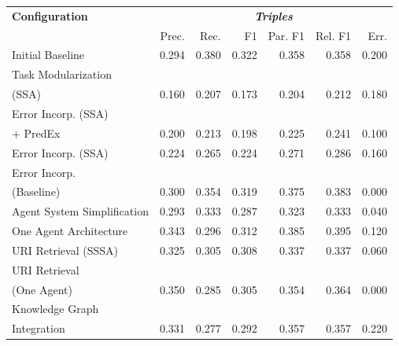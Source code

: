\documentclass[a4paper,oneside,bibliography=totoc]{scrbook}
\begin{document}
\begin{table}[h]
  \centering
  \begin{tabular}{p{5cm}|rrrrrr}
    \toprule
    \textbf{Configuration}      & \multicolumn{6}{c}{\textit{\textbf{Triples}}}                                             \\
                                & Prec.                                         & Rec.  & F1    & Par. F1 & Rel. F1 & Err.  \\
    \midrule
    Initial Baseline            & 0.294                                         & 0.380 & 0.322 & 0.358   & 0.358   & 0.200 \\
    Task Modularization                                                                                                     \\(SSA) & 0.160 & 0.207 & 0.173 & 0.204 & 0.212 & 0.180 \\
    Error Incorp. (SSA)                                                                                                     \\ + PredEx & 0.200 & 0.213 & 0.198 & 0.225 & 0.241 & 0.100 \\
    Error Incorp. (SSA)         & 0.224                                         & 0.265 & 0.224 & 0.271   & 0.286   & 0.160 \\
    Error Incorp.                                                                                                           \\(Baseline) & 0.300 & 0.354 & 0.319 & 0.375 & 0.383 & 0.000 \\
    Agent System Simplification & 0.293                                         & 0.333 & 0.287 & 0.323   & 0.333   & 0.040 \\
    One Agent Architecture      & 0.343                                         & 0.296 & 0.312 & 0.385   & 0.395   & 0.120 \\
    URI Retrieval (SSSA)        & 0.325                                         & 0.305 & 0.308 & 0.337   & 0.337   & 0.060 \\
    URI Retrieval                                                                                                           \\(One Agent) & 0.350 & 0.285 & 0.305 & 0.354 & 0.364 & 0.000 \\
    Knowledge Graph                                                                                                         \\Integration & 0.331 & 0.277 & 0.292 & 0.357 & 0.357 & 0.220 \\

\end{tabular}
\end{table}
\end{document}
